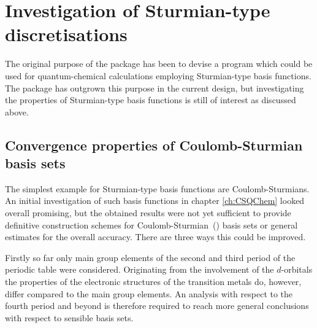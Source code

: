 
%
%
\section{Investigation of Sturmian-type discretisations}
\label{sec:newSturmian}
The original purpose of the \molsturm package has been to devise a program
which could be used for quantum-chemical calculations
employing Sturmian-type basis functions.
The package has outgrown this purpose in the current design,
but investigating the properties
of Sturmian-type basis functions is still of interest
as discussed above.

\subsection{Convergence properties of Coulomb-Sturmian basis sets}
The simplest example for Sturmian-type basis functions are Coulomb-Sturmians.
An initial investigation of such basis functions
in chapter \ref{ch:CSQChem} looked overall promising,
but the obtained results were not yet sufficient to provide definitive
construction schemes for Coulomb-Sturmian~(\CS) basis sets
or general estimates for the overall accuracy.
There are three ways this could be improved.

Firstly so far only main group elements of the second and third
period of the periodic table were considered.
Originating from the involvement of the $d$-orbitals
the properties of the electronic structures of the transition metals do, however,
differ compared to the main group elements.
An analysis with respect to the fourth period and beyond
is therefore required to reach more general conclusions
with respect to sensible \CS basis sets.

